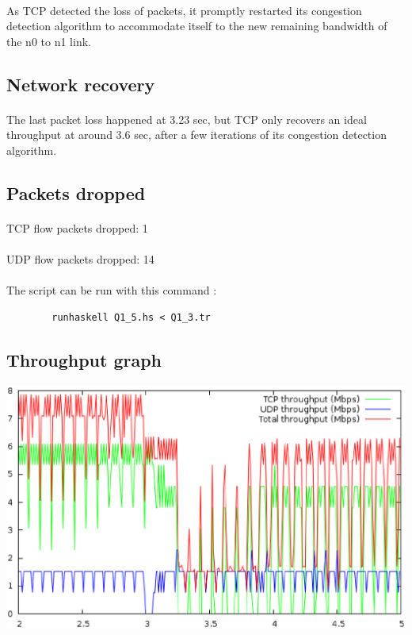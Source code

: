 \documentclass[a4paper]{article}
\begin{document}
    \paragraph{}As TCP detected the loss of packets, it promptly restarted its
congestion detection algorithm to accommodate itself to the new remaining
bandwidth of the n0 to n1 link.

   \subsection{Network recovery}
   \label{Network recovery}

   \paragraph{}The last packet loss happened at 3.23 sec, but TCP only recovers
an ideal throughput at around 3.6 sec, after a few iterations of its congestion
detection algorithm.

   \subsection{Packets dropped}

   \paragraph{}TCP flow packets dropped: 1
   \paragraph{}UDP flow packets dropped: 14

    \paragraph{}The script can be run with this command :
    \begin{verbatim}
        runhaskell Q1_5.hs < Q1_3.tr
    \end{verbatim}

   \subsection{Throughput graph}

    \begin{center}
        \includegraphics[width=\textwidth]{question1/Q1_6.eps}
    \end{center}
\end{document}
